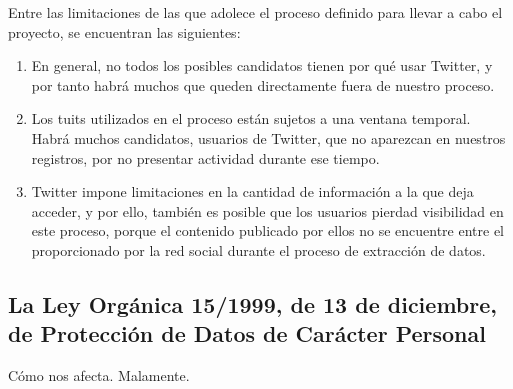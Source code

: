 Entre las limitaciones de las que adolece el proceso definido para llevar a cabo el proyecto, se encuentran las 
siguientes:
\begin{enumerate}
\item En general, no todos los posibles candidatos tienen por qué usar Twitter, y por tanto habrá muchos que 
queden directamente fuera de nuestro proceso.
\item Los tuits utilizados en el proceso están sujetos a una ventana temporal. Habrá muchos candidatos,
usuarios de Twitter, que no aparezcan en nuestros registros, por no presentar actividad durante ese tiempo.
\item Twitter impone limitaciones en la cantidad de información a la que deja acceder, y por ello, también es
posible que los usuarios pierdad visibilidad en este proceso, 
porque el contenido publicado por ellos no se encuentre entre el proporcionado por la red social durante el proceso
de extracción de datos.

\end{enumerate}
\subsection{La Ley Orgánica 15/1999, de 13 de diciembre, de Protección de Datos
de Carácter Personal}
Cómo nos afecta. Malamente.



